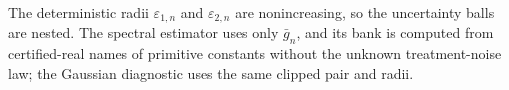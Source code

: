 The deterministic radii \(\varepsilon_{1,n}\) and \(\varepsilon_{2,n}\) are nonincreasing, so the uncertainty balls are nested.  The spectral estimator uses only \(\bar g_n\), and its bank is computed from certified-real names of primitive constants without the unknown treatment-noise law; the Gaussian diagnostic uses the same clipped pair and radii.